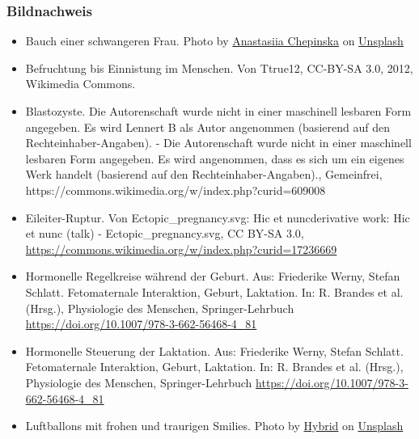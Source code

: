 \documentclass{beamer}
\begin{document}
\begin{frame}
\frametitle{Bildnachweis}

\begin{tiny}
 
\begin{itemize}


\item
Bauch einer schwangeren Frau. Photo by \href{https://unsplash.com/es/@anastasiiachepinska?utm_source=unsplash&utm_medium=referral&utm_content=creditCopyText}{Anastasiia Chepinska} on \href{https://unsplash.com/s/photos/pregnancy?utm_source=unsplash&utm_medium=referral&utm_content=creditCopyText}{Unsplash}


\item
Befruchtung bis Einnistung im Menschen. Von Ttrue12, CC-BY-SA 3.0, 2012, Wikimedia Commons. 

\item
Blastozyste. Die Autorenschaft wurde nicht in einer maschinell lesbaren Form angegeben. Es wird Lennert B als Autor angenommen (basierend auf den Rechteinhaber-Angaben). - Die Autorenschaft wurde nicht in einer maschinell lesbaren Form angegeben. Es wird angenommen, dass es sich um ein eigenes Werk handelt (basierend auf den Rechteinhaber-Angaben)., Gemeinfrei, https://commons.wikimedia.org/w/index.php?curid=609008

\item
Eileiter-Ruptur. Von Ectopic\_pregnancy.svg: Hic et nuncderivative work: Hic et nunc (talk) - Ectopic\_pregnancy.svg, CC BY-SA 3.0, \url{https://commons.wikimedia.org/w/index.php?curid=17236669}

\item
Hormonelle Regelkreise während der Geburt. Aus: Friederike Werny, Stefan Schlatt. Fetomaternale Interaktion, Geburt, Laktation. In: R. Brandes et al. (Hrsg.), Physiologie des Menschen, Springer-Lehrbuch \url{https://doi.org/10.1007/978-3-662-56468-4_81}


\item
Hormonelle Steuerung der Laktation. Aus: Friederike Werny, Stefan Schlatt. Fetomaternale Interaktion, Geburt, Laktation. In: R. Brandes et al. (Hrsg.), Physiologie des Menschen, Springer-Lehrbuch \url{https://doi.org/10.1007/978-3-662-56468-4_81}


\item
Luftballons mit frohen und traurigen Smilies. Photo by \href{https://unsplash.com/@artbyhybrid?utm_source=unsplash&utm_medium=referral&utm_content=creditCopyText}{Hybrid} on \href{https://unsplash.com/s/photos/feedback?utm_source=unsplash&utm_medium=referral&utm_content=creditCopyText}{Unsplash}




\end{itemize}
\end{tiny}
\end{frame}
\end{document}
